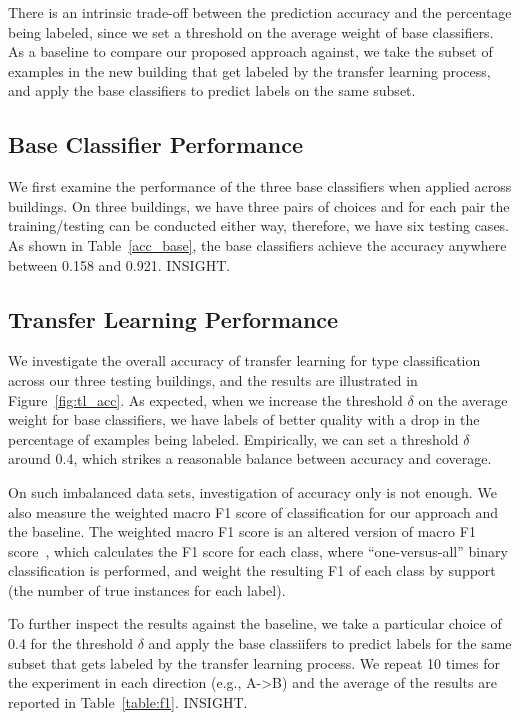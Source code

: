 There is an intrinsic trade-off between the prediction accuracy and the percentage being labeled, since we set a threshold on the average weight of base classifiers. 
As a baseline to compare our proposed approach against, we take the subset of examples in the new building that get labeled by the transfer learning process, and apply the base classifiers to predict labels on the same subset. 

\subsection{Base Classifier Performance}
We first examine the performance of the three base classifiers when applied across buildings. 
On three buildings, we have three pairs of choices and for each pair the training/testing can be conducted either way, therefore, we have six testing cases.
As shown in Table~\ref{acc_base}, the base classifiers achieve the accuracy anywhere between 0.158 and 0.921.
INSIGHT.

\subsection{Transfer Learning Performance}
We investigate the overall accuracy of transfer learning for type classification across our three testing buildings, and the results are illustrated in Figure~\ref{fig:tl_acc}.
As expected, when we increase the threshold $\delta$ on the average weight for base classifiers, we have labels of better quality with a drop in the percentage of examples being labeled. Empirically, we can set a threshold $\delta$ around 0.4, which strikes a reasonable balance between accuracy and coverage.

On such imbalanced data sets, investigation of accuracy only is not enough. We also measure the weighted macro F1 score of classification for our approach and the baseline. The weighted macro F1 score is an altered version of macro F1 score~\cite{yang}, which calculates the F1 score for each class, where ``one-versus-all'' binary classification is performed, and weight the resulting F1 of each class by support (the number of true instances for each label). 

To further inspect the results against the baseline, we take a particular choice of 0.4 for the threshold $\delta$ and apply the base classiifers to predict labels for the same subset that gets labeled by the transfer learning process. We repeat 10 times for the experiment in each direction (e.g., A->B) and the average of the results are reported in Table~\ref{table:f1}. 
INSIGHT.

